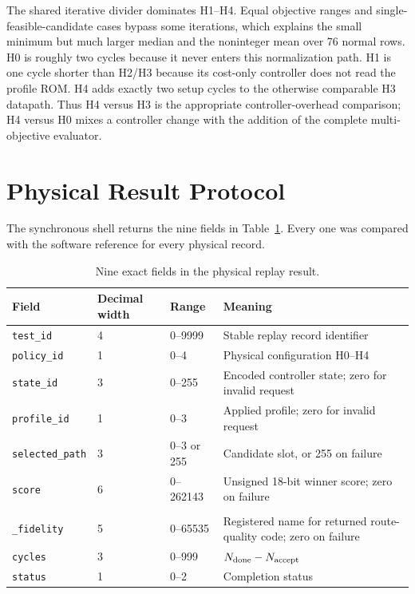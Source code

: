 The shared iterative divider dominates H1--H4. Equal objective ranges and
single-feasible-candidate cases bypass some iterations, which explains the small
minimum but much larger median and the noninteger mean over 76 normal rows. H0 is
roughly two cycles because it never enters this normalization path. H1 is one cycle
shorter than H2/H3 because its cost-only controller does not read the profile ROM.
H4 adds exactly two setup cycles to the otherwise comparable H3 datapath. Thus H4
versus H3 is the appropriate controller-overhead comparison; H4 versus H0 mixes a
controller change with the addition of the complete multi-objective evaluator.

\section{Physical Result Protocol}

The synchronous shell returns the nine fields in Table~\ref{tab:nine-result-fields}.
Every one was compared with the software reference for every physical record.

\begin{table}[H]
\centering
\scriptsize
\caption{Nine exact fields in the physical replay result.}
\label{tab:nine-result-fields}
\begin{tabularx}{\textwidth}{@{}p{2.7cm}p{1.4cm}p{2.4cm}X@{}}
\toprule
\textbf{Field} & \textbf{Decimal width} & \textbf{Range} & \textbf{Meaning}\\
\midrule
\texttt{test\_id} & 4 & 0--9999 & Stable replay record identifier\\
\texttt{policy\_id} & 1 & 0--4 & Physical configuration H0--H4\\
\texttt{state\_id} & 3 & 0--255 & Encoded controller state; zero for invalid request\\
\texttt{profile\_id} & 1 & 0--3 & Applied profile; zero for invalid request\\
\texttt{selected\_path} & 3 & 0--3 or 255 & Candidate slot, or 255 on failure\\
\texttt{score} & 6 & 0--262143 & Unsigned 18-bit winner score; zero on failure\\
\makecell[l]{\texttt{bottleneck}\\\texttt{\_fidelity}} & 5 & 0--65535 & Registered name for returned route-quality
code; zero on failure\\
\texttt{cycles} & 3 & 0--999 & $N_{\rm done}-N_{\rm accept}$\\
\texttt{status} & 1 & 0--2 & Completion status\\
\bottomrule
\end{tabularx}
\end{table}


